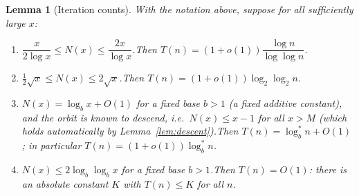 \documentclass[12pt]{article}
\newtheorem{lemma}{Lemma}
\theoremstyle{definition}
\begin{document}
\begin{lemma}[Iteration counts]\label{lem:rates}
With the notation above, suppose for all sufficiently large $x$:
\begin{enumerate}
\item[(P)] $\dfrac{x}{2\log x}\le N(x)\le\dfrac{2x}{\log x}$.\quad Then
$T(n)=(1+o(1))\dfrac{\log n}{\log\log n}$.
\item[(S)] $\tfrac12\sqrt x\le N(x)\le 2\sqrt x$.\quad Then
$T(n)=(1+o(1))\log_2\log_2 n$.
\item[(L)] $N(x)=\log_b x+O(1)$ for a fixed base $b>1$ (a fixed additive
constant), \emph{and} the orbit is known to descend, i.e.\ $N(x)\le x-1$ for all
$x>M$ (which holds automatically by Lemma~\ref{lem:descent}).\quad Then
$T(n)=\log^*_b n+O(1)$; in particular $T(n)=(1+o(1))\log^*_b n$.
\item[(D)] $N(x)\le 2\log_b\log_b x$ for a fixed base $b>1$.\quad Then $T(n)=O(1)$:
there is an absolute constant $K$ with $T(n)\le K$ for all $n$.
\end{enumerate}
\end{lemma}
\end{document}

